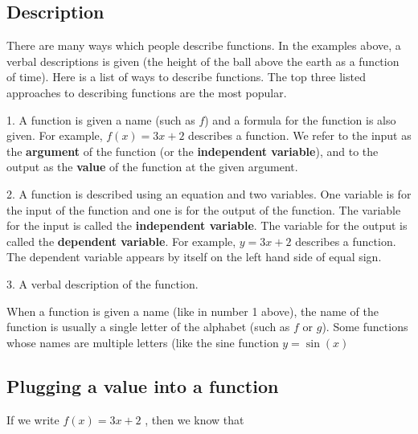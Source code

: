 \subsection{Description}
\label{sss:desc-67da}




There are many ways which people describe functions. In the examples above, a verbal
descriptions is given (the height of the ball above the earth as a function of time). Here
is a list of ways to describe functions. The top three listed approaches to describing
functions are the most popular.



1.  A function is given a name (such as $f$) and a formula for the function is also given.
For example, $f(x)=3x+2$ describes a function. We refer to the input as the
\textbf{argument} of the function (or the \textbf{independent variable}), and to the
output as the \textbf{value} of the function at the given argument.

2.  A function is described using an equation and two variables. One variable is for the
input of the function and one is for the output of the function. The variable for the
input is called the \textbf{independent variable}. The variable for the output is called
the \textbf{dependent variable}. For example, $y=3x+2$ describes a function. The dependent
variable appears by itself on the left hand side of equal sign.

3.  A verbal description of the function.



When a function is given a name (like in number 1 above), the name of the function is
usually a single letter of the alphabet (such as $f$ or $g$). Some functions whose names
are multiple letters (like the sine function $y=\sin(x)$




\subsection{Plugging a value into a function}
\label{sss:plug-50c6}




If we write $f(x)=3x+2$ , then we know that



